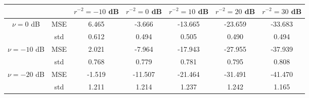 \begin{tabular}{ccccccc}
\toprule
             &     &  $r^{-2}=-10$ dB &  $r^{-2}=0$ dB &  $r^{-2}=10$ dB &  $r^{-2}=20$ dB &  $r^{-2}=30$ dB \\
\midrule
$\nu=0$ dB & MSE &            6.465 &         -3.666 &         -13.665 &         -23.659 &         -33.683 \\
             & std &            0.612 &          0.494 &           0.505 &           0.490 &           0.494 \\ \hline
$\nu=-10$ dB & MSE &            2.021 &         -7.964 &         -17.943 &         -27.955 &         -37.939 \\
             & std &            0.768 &          0.779 &           0.781 &           0.795 &           0.808 \\ \hline
$\nu=-20$ dB & MSE &           -1.519 &        -11.507 &         -21.464 &         -31.491 &         -41.470 \\
             & std &            1.211 &          1.214 &           1.237 &           1.242 &           1.165 \\
\bottomrule
\end{tabular}
